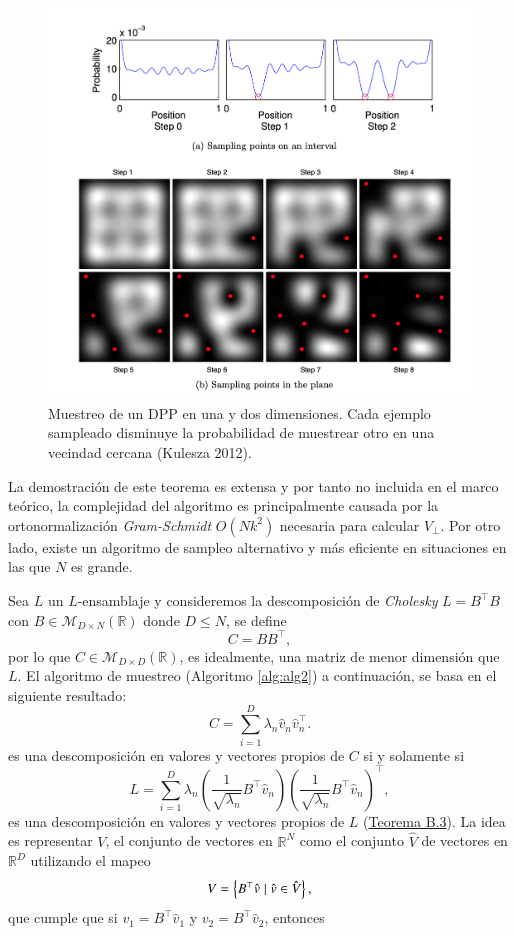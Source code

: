 \begin{figure}[ht]
    \centering
    \includegraphics[width=12cm]{img/tesis/DPP_sampling.png}
    \caption{Muestreo de un DPP en una y dos dimensiones. Cada ejemplo sampleado disminuye la probabilidad de muestrear otro en una vecindad cercana (Kulesza 2012).}
    \label{fig:example}
\end{figure}

La demostración de este teorema es extensa y por tanto no incluida en el marco teórico, la complejidad del algoritmo es principalmente causada por la ortonormalización \textit{Gram-Schmidt} $O(Nk^2)$ necesaria para calcular $V_{\perp}$. Por otro lado, existe un algoritmo de sampleo alternativo y más eficiente en situaciones en las que $N$ es grande. 

\vspace{0.2cm}

Sea $L$ un $L$-ensamblaje y consideremos la descomposición de \textit{Cholesky} $L = B^{\top}B$ con $B \in \mathcal{M}_{D \times N}(\mathbb{R})$ donde $D \leq N$, se define 
\[
C = BB^{\top}, 
\]
por lo que $C \in \mathcal{M}_{D \times D}(\mathbb{R})$, es idealmente, una matriz de menor dimensión que $L$. El algoritmo de muestreo (Algoritmo \ref{alg:alg2}) a continuación, se basa en el siguiente resultado: 
\[ 
C = \sum_{i=1}^D \lambda_n\hat{v}_n\hat{v}^{\top}_n.
\]
es una descomposición en valores y vectores propios de $C$ si y solamente si 
\[
L = \sum_{i=1}^D \lambda_n \left ( \frac{1}{\sqrt{\lambda_n}}B^{\top}\hat{v}_n\right ) \left ( \frac{1}{\sqrt{\lambda_n}}B^{\top}\hat{v}_n\right )^{\top},
\]
es una descomposición en valores y vectores propios de $L$ (\hyperlink{Teorema B.3}{Teorema B.3}). La idea es representar $V$, el conjunto de vectores en $\mathbb{R}^N$ como el conjunto $\hat{V}$ de vectores en $\mathbb{R}^D$ utilizando el mapeo
\[
V = \left \{ B^{\top}\hat{v} \hspace{0.1cm} | \hspace{0.1cm} \hat{v} \in \hat{V} \right \},
\]
que cumple que si $v_1 = B^{\top}\hat{v}_1$ y $v_2 = B^{\top}\hat{v}_2$, entonces 

